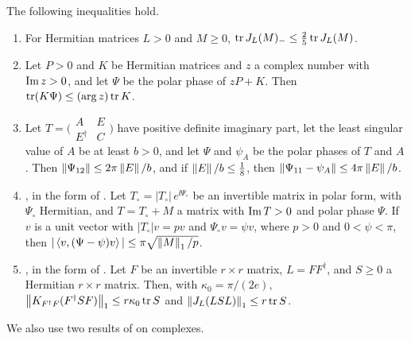 \begin{proposition}\label{prop:used}
The following inequalities hold.
\begin{enumerate}
\item[(i)] \cite[Theorem~3.1]{wue26b} For Hermitian matrices $L>0$ and
 $M\geq0$, $\operatorname{tr} J_L(M)_-\leq\frac25\operatorname{tr} J_L(M)$.
\item[(ii)] \cite[Corollary~4.2]{wue26b} Let $P>0$ and $K$ be Hermitian
 matrices and $z$ a complex number with $\operatorname{Im} z>0$, and let $\Psi$ be the
 polar phase of $zP+K$. Then $\operatorname{tr}(K\Psi)\leq(\arg z)\operatorname{tr} K$.
\item[(iii)] \cite[Lemma~3.1]{wue26a} Let
 $T=\bigl(\begin{smallmatrix}A&E\\E^\dagger&C\end{smallmatrix}\bigr)$ have
 positive definite imaginary part, let the least singular value of $A$ be at
 least $b>0$, and let $\Psi$ and $\psi_A$ be the polar phases of $T$ and $A$.
 Then $\left\lVert\Psi_{12}\right\rVert\leq2\pi\left\lVert E\right\rVert/b$, and if $\left\lVert E\right\rVert/b\leq\frac18$, then
 $\left\lVert\Psi_{11}-\psi_A\right\rVert\leq4\pi\left\lVert E\right\rVert/b$.
\item[(iv)] \cite[Lemma~3.2]{wue26a}, in the form of
 \cite[Proposition~2.3(v)]{wue26b}. Let
 $T_\circ=|T_\circ|\,e^{\ii\Psi_\circ}$ be an invertible matrix in polar form,
 with $\Psi_\circ$ Hermitian, and $T=T_\circ+M$ a matrix with $\operatorname{Im} T>0$ and
 polar phase $\Psi$. If $v$ is a unit vector with $|T_\circ|v=pv$ and
 $\Psi_\circ v=\psi v$, where $p>0$ and $0<\psi<\pi$, then
 $|\left\langle v,(\Psi-\psi)v\right\rangle|\leq\pi\sqrt{\left\lVert M\right\rVert_1/p}$.
\item[(v)] \cite[Lemma~4.2 and \S6.3]{wue26a}, in the form of
 \cite[Proposition~2.3(ii)]{wue26b}. Let $F$ be an invertible $r\times r$
 matrix, $L=FF^\dagger$, and $S\geq0$ a Hermitian $r\times r$ matrix. Then,
 with $\kappa_0=\pi/(2e)$,
 $\left\lVert K_{F^\dagger F}(F^\dagger SF)\right\rVert_1\leq r\kappa_0\operatorname{tr} S$ and
 $\left\lVert J_L(LSL)\right\rVert_1\leq r\operatorname{tr} S$.
\end{enumerate}
\end{proposition}

We also use two results of \cite{wue26c} on complexes.

